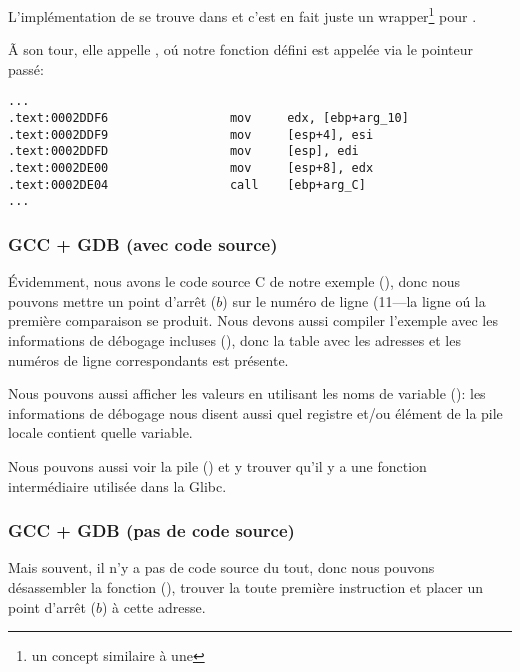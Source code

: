 
L'implémentation de \qsort se trouve dans  et c'est en fait juste un
wrapper\footnote{un concept similaire à une }
pour .

Ã son tour, elle appelle , oú notre fonction défini est appelée via
le pointeur passé:

\begin{lstlisting}[caption=(fihier libc.so.6{,} glibc version---2.10.1),style=customasmx86]
...
.text:0002DDF6                 mov     edx, [ebp+arg_10]
.text:0002DDF9                 mov     [esp+4], esi
.text:0002DDFD                 mov     [esp], edi
.text:0002DE00                 mov     [esp+8], edx
.text:0002DE04                 call    [ebp+arg_C]
...
\end{lstlisting}

\subsubsection{GCC + GDB (avec code source)}

Évidemment, nous avons le code source C de notre exemple (), donc
nous pouvons mettre un point d'arrêt ($b$) sur le numéro de ligne (11---la ligne
oú la première comparaison se produit.
Nous devons aussi compiler l'exemple avec les informations de débogage incluses (),
donc la table avec les adresses et les numéros de ligne correspondants est présente.

Nous pouvons aussi afficher les valeurs en utilisant les noms de variable ():
les informations de débogage nous disent aussi quel registre et/ou élément de la
pile locale contient quelle variable.

Nous pouvons aussi voir la pile () et y trouver qu'il y a une fonction intermédiaire
 utilisée dans la Glibc.



\subsubsection{GCC + GDB (pas de code source)}

Mais souvent, il n'y a pas de code source du tout, donc nous pouvons désassembler
la fonction \comp (), trouver la toute première instruction \CMP et placer
un point d'arrêt ($b$) à cette adresse.

